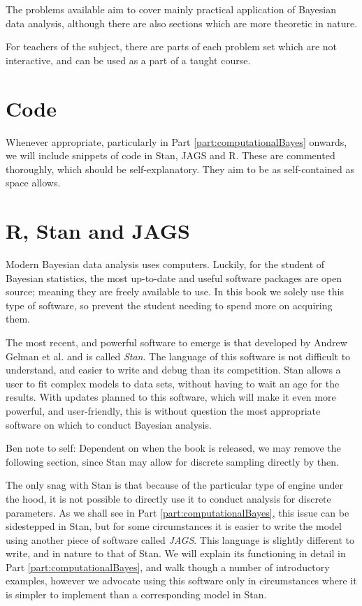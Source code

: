 \documentclass[11pt,fullpage]{book}
\begin{document}
The problems available aim to cover mainly practical application of Bayesian data analysis, although there are also sections which are more theoretic in nature.

For teachers of the subject, there are parts of each problem set which are not interactive, and can be used as a part of a taught course.

\section{Code}
Whenever appropriate, particularly in Part \ref{part:computationalBayes} onwards, we will include snippets of code in Stan, JAGS and R. These are commented thoroughly, which should be self-explanatory. They aim to be as self-contained as space allows.

\section{R, Stan and JAGS}
Modern Bayesian data analysis uses computers. Luckily, for the student of Bayesian statistics, the most up-to-date and useful software packages are open source; meaning they are freely available to use. In this book we solely use this type of software, so prevent the student needing to spend more on acquiring them.

The most recent, and powerful software to emerge is that developed by Andrew Gelman et al.\cite{stan-software:2014} and is called \textit{Stan}. The language of this software is not difficult to understand, and easier to write and debug than its competition. Stan allows a user to fit complex models to data sets, without having to wait an age for the results. With updates planned to this software, which will make it even more powerful, and user-friendly, this is without question the most appropriate software on which to conduct Bayesian analysis.

Ben note to self: Dependent on when the book is released, we may remove the following section, since Stan may allow for discrete sampling directly by then.

The only snag with Stan is that because of the particular type of engine under the hood, it is not possible to directly use it to conduct analysis for discrete parameters. As we shall see in Part \ref{part:computationalBayes}, this issue can be sidestepped in Stan, but for some circumstances it is easier to write the model using another piece of software called \textit{JAGS}\cite{plummer2003jags}. This language is slightly different to write, and in nature to that of Stan. We will explain its functioning in detail in Part \ref{part:computationalBayes}, and walk though a number of introductory examples, however we advocate using this software only in circumstances where it is simpler to implement than a corresponding model in Stan.
\end{document}
